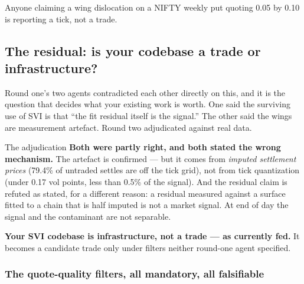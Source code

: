 \documentclass[11pt,a4paper]{article}
\begin{document}
Anyone claiming a wing dislocation on a NIFTY weekly put quoting 0.05 by 0.10 is
reporting a tick, not a trade.

\subsection{The residual: is your codebase a trade or infrastructure?}
\label{sec:residual}

Round one's two agents contradicted each other directly on this, and it is the
question that decides what your existing work is worth. One said the surviving
use of SVI is that ``the fit residual itself is the signal.'' The other said the
wings are measurement artefact. Round two adjudicated against real data.

\begin{keyfact}{The adjudication}
\textbf{Both were partly right, and both stated the wrong mechanism.} The
artefact is confirmed --- but it comes from \emph{imputed settlement prices}
(79.4\% of untraded settles are off the tick grid), not from tick quantization
(under 0.17 vol points, less than 0.5\% of the signal). And the residual claim is
refuted as stated, for a different reason: a residual measured against a surface
fitted to a chain that is half imputed is not a market signal. At end of day the
signal and the contaminant are not separable.

\textbf{Your SVI codebase is infrastructure, not a trade --- as currently fed.}
It becomes a candidate trade only under filters neither round-one agent specified.
\end{keyfact}

\subsubsection{The quote-quality filters, all mandatory, all falsifiable}
\end{document}
